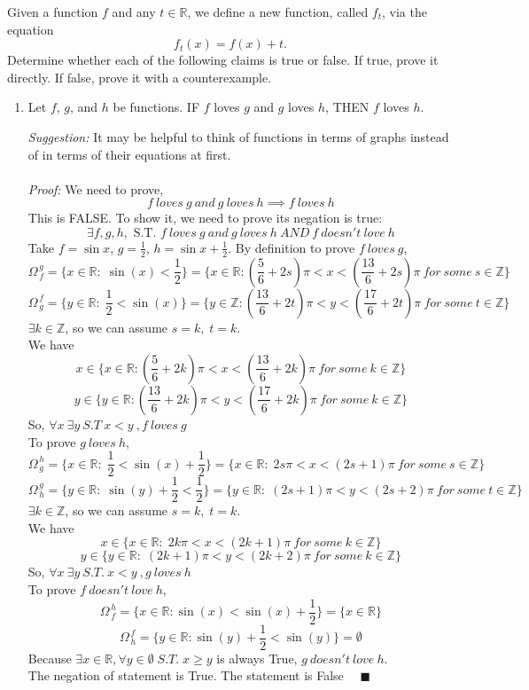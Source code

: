 \documentclass[12pt]{exam}
\newcommand{\vv}{\vspace{.2cm}}
\newcommand{\R}{\mathbb{R}}
\newcommand{\Z}{\mathbb{Z}}
\newcommand{\M}[2]{\Omega^{\, #2}_{\, #1}}
\begin{document}
\begin{enumerate}
	Given a function $f$ and any $t \in \R$, we define a new function, called $f_t$, via the equation
	$$
		f_t(x) = f(x) + t.
	$$
	Determine whether each of the following claims is true or false.  If true, prove it directly.  If false, prove it with a counterexample.
	\begin{enumerate}
		\item  Let $f$, $g$, and $h$ be functions. 
				IF $f$ loves $g$ and $g$ loves $h$,
				THEN $f$ loves $h$.
			
			\vv
			\emph{Suggestion:}  It may be helpful to think of functions in terms of graphs instead of in terms of their equations at first.
			\vv
		\\
		\\
		\emph{Proof:}
		We need to prove,
		$$
		    f\ loves\ g\ and\ g\ loves\ h\implies f\ loves\ h
		$$
		This is FALSE. To show it, we need to prove its negation is true:
		$$
			\exists f, g, h, \mbox{ S.T. }
		    f\ loves\ g\ and\ g\ loves\ h\ AND\ f\ doesn't\ love\ h
		$$
		Take $f=\sin{x}$, $g=\frac{1}{2}$, $h=\sin{x}+\frac{1}{2}$. By definition to prove $f\ loves\ g$,
		$$
		    \M{f}{g} = \{x \in \R : \; \sin(x) < \frac{1}{2} \} = \{x \in \R : (\frac{5}{6}+2s)\pi < x < (\frac{13}{6}+2s)\pi\ for\ some\ s\in\Z\}
		$$
		$$
		    \M{g}{f} = \{y \in \R : \; \frac{1}{2} < \sin(x) \} = \{y \in \Z : (\frac{13}{6}+2t)\pi < y < (\frac{17}{6}+2t)\pi\ for\ some\ t\in\Z\}
		$$
		$\exists k \in \Z$, so we can assume $s = k, \; t = k$.\\
		We have 
		$$
			x \in \{x \in \R : (\frac{5}{6}+2k)\pi < x < (\frac{13}{6}+2k)\pi\ for\ some\ k\in\Z\}
		$$
		$$
			y \in \{y \in \R : (\frac{13}{6}+2k)\pi < y < (\frac{17}{6}+2k)\pi\ for\ some\ k\in\Z\}
		$$
		So, $\forall x\ \exists y\ S.T\ x < y\ , f\ loves\ g$\\
		To prove $g\ loves\ h$,
		$$ 
			\M{g}{h} = \{x \in \R : \; \frac{1}{2} < \sin(x)+\frac{1}{2} \} = \{x \in \R : \; 2s\pi < x < (2s + 1)\pi\ for\ some\ s\in\Z\}
		$$
		$$ 
			\M{h}{g} = \{y \in \R : \; \sin(y)+\frac{1}{2} < \frac{1}{2} \} = \{y \in \R : \; (2s + 1)\pi < y < (2s + 2)\pi\ for\ some\ t\in\Z\}
		$$
		$\exists k \in \Z$, so we can assume $s = k, \; t = k$.\\
		We have 
		$$
			x \in \{x \in \R : \; 2k\pi < x < (2k + 1)\pi\ for\ some\ k\in\Z\}
		$$
		$$
			y \in \{y \in \R : \; (2k + 1)\pi < y < (2k + 2)\pi\ for\ some\ k\in\Z\}
		$$
		So, $\forall x\ \exists y\ S.T.\ x < y\ , g\ loves\ h$\\
		To prove $f\ doesn't\ love\ h$,
		$$ 
			\M{f}{h} = \{x \in \R : \sin(x) < \sin(x)+\frac{1}{2} \} = \{x \in \R\}
		$$
		$$ 
			\M{h}{f} = \{y \in \R : \sin(y)+\frac{1}{2} < \sin(y) \} = \emptyset
		$$
		Because $ \exists x \in \R, \forall y \in \emptyset \; S.T. \; x \geq y $ is always True, $g\ doesn't\ love\ h$.\\
		The negation of statement is True. The statement is False $\quad \blacksquare$
		

\end{enumerate}
\end{enumerate}
\end{document}

